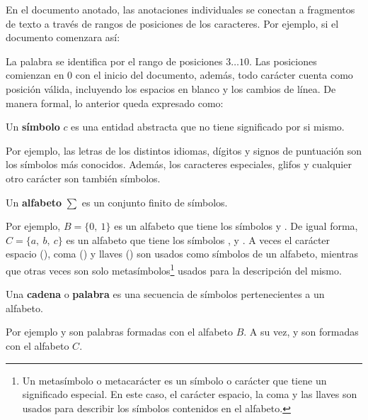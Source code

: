 En el documento anotado, las anotaciones individuales se conectan a fragmentos de texto a través de rangos de posiciones de los caracteres. Por ejemplo, si el documento comenzara así:

\begin{center}
\end{center}

La palabra  se identifica por el rango de posiciones $3\dots10$. Las posiciones comienzan en $0$ con el inicio del documento, además, todo carácter cuenta como posición válida, incluyendo los espacios en blanco y los cambios de línea. De manera formal, lo anterior queda expresado como:

\begin{definition}
	Un \textbf{símbolo} $c$ es una entidad abstracta que no tiene significado por si mismo.
\end{definition}

Por ejemplo, las letras de los distintos idiomas, dígitos y signos de puntuación son los símbolos más conocidos. Además, los caracteres especiales, glifos y cualquier otro carácter son también símbolos.

\begin{definition}
	Un \textbf{alfabeto} $\sum$ es un conjunto finito de símbolos.
\end{definition}

Por ejemplo, $B = \{0,~1\}$ es un alfabeto que tiene los símbolos  y . De igual forma, $C=\{a,~b,~c\}$ es un alfabeto que tiene los símbolos ,  y . A veces el carácter espacio (\doublequote{ }), coma (\doublequote{,}) y llaves (\doublequote{\{\}}) son usados como símbolos de un alfabeto, mientras que otras veces son solo metasímbolos\footnote{Un metasímbolo o metacarácter es un símbolo o carácter que tiene un significado especial. En este caso, el carácter espacio, la coma y las llaves son usados para describir los símbolos contenidos en el alfabeto.} usados para la descripción del mismo.

\begin{definition}
	Una \textbf{cadena} o \textbf{palabra} es una secuencia de símbolos pertenecientes a un alfabeto.
\end{definition}

Por ejemplo  y  son palabras formadas con el alfabeto $B$. A su vez,  y  son formadas con el alfabeto $C$.

